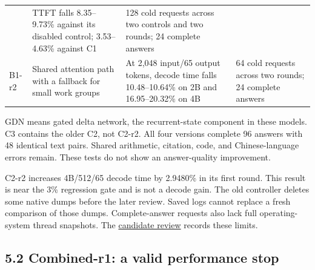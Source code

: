 \documentclass[10pt,a4paper]{article}
\begin{document}
\begin{longtable}[]{@{}llll@{}}
\begin{minipage}[t]{0.22\columnwidth}
\end{minipage} & \begin{minipage}[t]{0.22\columnwidth}\raggedright
TTFT falls 8.35--9.73\% against its disabled control; 3.53--4.63\%
against C1\strut
\end{minipage} & \begin{minipage}[t]{0.22\columnwidth}\raggedright
128 cold requests across two controls and two rounds; 24 complete
answers\strut
\end{minipage}\tabularnewline
\begin{minipage}[t]{0.22\columnwidth}\raggedright
B1-r2\strut
\end{minipage} & \begin{minipage}[t]{0.22\columnwidth}\raggedright
Shared attention path with a fallback for small work groups\strut
\end{minipage} & \begin{minipage}[t]{0.22\columnwidth}\raggedright
At 2,048 input/65 output tokens, decode time falls 10.48--10.64\% on 2B
and 16.95--20.32\% on 4B\strut
\end{minipage} & \begin{minipage}[t]{0.22\columnwidth}\raggedright
64 cold requests across two rounds; 24 complete answers\strut
\end{minipage}\tabularnewline
\bottomrule
\end{longtable}

GDN means gated delta network, the recurrent-state component in these
models. C3 contains the older C2, not C2-r2. All four versions complete
96 answers with 48 identical text pairs. Shared arithmetic, citation,
code, and Chinese-language errors remain. These tests do not show an
answer-quality improvement.

C2-r2 increases 4B/512/65 decode time by 2.9480\% in its first round.
This result is near the 3\% regression gate and is not a decode gain.
The old controller deletes some native dumps before the later review.
Saved logs cannot replace a fresh comparison of those dumps.
Complete-answer requests also lack full operating-system thread
snapshots. The
\href{https://github.com/MoyaMryia/riscv-accl/blob/main/spacemit/reports/2026-10-09-local-candidate-result-rejudgment.md}{candidate
review} records these limits.

\hypertarget{combined-r1-a-valid-performance-stop}{%
\subsection{5.2 Combined-r1: a valid performance
stop}\label{combined-r1-a-valid-performance-stop}}
\end{document}

